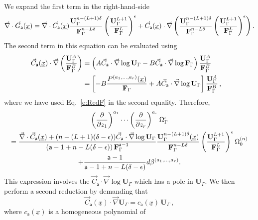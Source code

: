 \documentclass[a4paper,12pt]{article}
\numberwithin{equation}{section}
\numberwithin{figure}{section}
\begin{document}
We expand the first term in the right-hand-side
\begin{multline}
  \vec\nabla \cdot \vec G_{\mathsf{a}}(\underline x)=  \vec\nabla \cdot \vec C_{\mathsf{a}}(\underline x) {\textbf{U}_\Gamma^{n-(L+1)\delta}\over
  \textbf{F}_\Gamma^{n-L\delta}} \left(\mathbf{U}_\Gamma^{L+1}\over
  \mathbf{F}_\Gamma^L\right)^\epsilon
+
  \vec C_{\mathsf{a}}(\underline x) \cdot\vec\nabla  \left(  {\textbf{U}_\Gamma^{n-(L+1)\delta}\over
  \textbf{F}_\Gamma^{n-L\delta}} \left(\mathbf{U}_\Gamma^{L+1}\over
  \mathbf{F}_\Gamma^L\right)^\epsilon\right) .
\end{multline}
%
The second term in this equation can be evaluated using 
\begin{align}
  \vec C_{\mathsf{a}}(\underline x)\cdot \vec\nabla \left(\mathbf{U}_\Gamma^{A}\over
\mathbf{F}_\Gamma^B\right)&=\left(A \vec
C_{\mathsf{a}}\cdot \vec\nabla \log\mathbf{U}_\Gamma -B \vec
C_{\mathsf{a}}\cdot \vec\nabla \log \mathbf{F}_\Gamma\right) {\mathbf{U}_\Gamma^{A}\over
\mathbf{F}_\Gamma^B} \cr
&=\left[-B{
    P^{(a_1,\dots,a_r)}(\underline x)\over
  \mathbf{F}_\Gamma}   
+
 A \vec
C_{\mathsf{a}}\cdot \vec\nabla \log\mathbf{U}_\Gamma \right] {\mathbf{U}_\Gamma^{A}\over
	\mathbf{F}_\Gamma^B}\,,
\end{align}
where we have used Eq.~\eqref{e:RedF} in the second equality. Therefore, 
\begin{multline}
	\label{e:Pred}
\left(\partial\over \partial z_1\right)^{a_1}\cdots\left(\partial
  \over\partial z_r\right)^{a_r} \Omega_\Gamma^\epsilon\cr={
\vec\nabla \cdot \vec C_{\mathsf{a}}
     (\underline x)
+   (n-(L+1)(\delta-\epsilon)) \vec
    C_{\mathsf{a}}\cdot\vec\nabla\log\mathbf{U}_\Gamma\over (\mathsf{a}-1+n-L(\delta-\epsilon))\,\textbf{F}_\Gamma^{\mathsf{a}-1}}
{ \textbf{U}_\Gamma^{n-(L+1)\delta} (\underline x)\over \textbf{F}_\Gamma^{n-L\delta}}
  \left(\textbf{U}_\Gamma^{L+1}\over \textbf{F}_\Gamma^L\right)^{\epsilon} 
  \Omega_0^{(n)}\cr
+{  \mathsf{a}-1 \over \mathsf{a}-1+n-L(\delta-\epsilon)} d\beta^{(a_1,\dots,a_r)}.
\end{multline}
%
This expression involves the $\vec
    C_{\mathsf{a}}\cdot\vec\nabla\log\mathbf{U}_\Gamma$ which has a
    pole in $\mathbf{U}_\Gamma$. We then perform a second reduction by demanding that
    \begin{equation}
      \label{e:RedU}
      \vec
    C_{\mathsf{a}}(\underline x)\cdot\vec\nabla \mathbf{U}_\Gamma =
    c_{\mathsf{a}}(\underline x) \, \mathbf{U}_\Gamma \, ,
    \end{equation}
where $ c_{\mathsf{a}}(\underline x)$ is a homogeneous polynomial of
\end{document}
